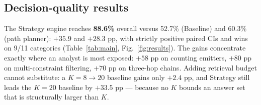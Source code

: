 \documentclass[review]{elsarticle}
\begin{document}
\subsection{Decision-quality results}
The Strategy engine reaches \textbf{88.6\%} overall versus 52.7\% (Baseline)
and 60.3\% (path planner): $+35.9$ and $+28.3$ pp, with strictly positive
paired CIs and wins on 9/11 categories (Table~\ref{tab:main},
Fig.~\ref{fig:results}). The gains concentrate exactly where an analyst is
most exposed: $+58$ pp on counting emitters, $+80$ pp on multi-constraint
filtering, $+70$ pp on three-hop chains. Adding retrieval budget cannot
substitute: a $K{=}8\!\to\!20$ baseline gains only $+2.4$ pp, and Strategy
still leads the $K{=}20$ baseline by $+33.5$ pp --- because no $K$ bounds an
answer set that is structurally larger than $K$.
\end{document}
